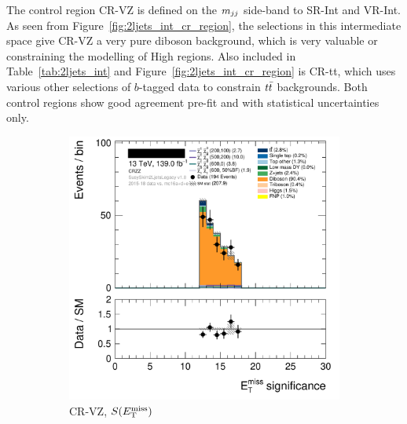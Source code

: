 The control region CR-VZ is defined on the $m_{jj}$ side-band to
SR-Int and VR-Int.
As seen from Figure~\ref{fig:2ljets_int_cr_region}, the selections in this
intermediate space give CR-VZ a very pure diboson background, which is very
valuable or constraining the modelling of High regions.
Also included in Table~\ref{tab:2ljets_int} and
Figure~\ref{fig:2ljets_int_cr_region} is CR-tt, which uses various other
selections of $b$-tagged data to constrain $t\bar t$ backgrounds.
Both control regions show good agreement pre-fit and with statistical uncertainties
only.
\begin{figure}[tp]
\centering
\begin{subfigure}{0.48\textwidth}
\centering
\includegraphics[width=\textwidth]{figures/2ljets_def_met_Sign_CRZZ.png}
\caption{CR-VZ, $S(E_\mathrm{T}^\mathrm{miss})$}
\end{subfigure}
\hfill
\begin{subfigure}{0.48\textwidth}
\centering

\end{subfigure}
\end{figure}
